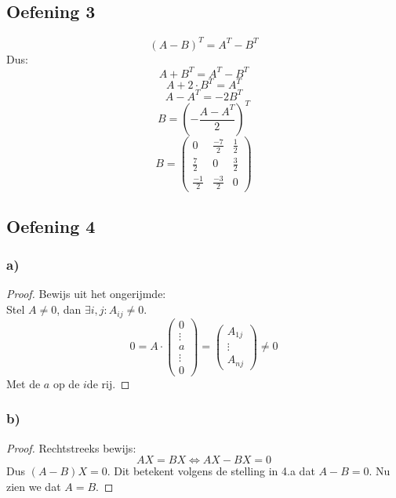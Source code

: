 \documentclass[lineaire_algebra_oplossingen.tex]{subfiles}
\begin{document}
\subsection{Oefening 3}
$$(A - B)^T = A^T - B^T$$
Dus:
$$A+B^T = A^T - B^T$$
$$A+2\cdot B^T = A^T$$
$$A - A^T = -2B^T$$
$$B = \left(-\frac{A - A^T}{2}\right)^T$$
$$ B = 
\begin{pmatrix}
0 & \frac{-7}{2} & \frac{1}{2}\\
\frac{7}{2} & 0 & \frac{3}{2}\\
\frac{-1}{2} & \frac{-3}{2} & 0
\end{pmatrix}
$$
\subsection{Oefening 4}
\subsubsection*{a)}
\begin{proof}
Bewijs uit het ongerijmde:\\
Stel $A \neq 0$, dan $\exists i, j: A_{ij} \neq 0$.
\[
0= A \cdot
\begin{pmatrix}
0\\\vdots\\a\\\vdots\\0
\end{pmatrix}
=
\begin{pmatrix}
A_{1j}\\\vdots\\A_{nj}
\end{pmatrix}
\neq 0
\]
Met de $a$ op de $i$de rij.
\end{proof}

\subsubsection*{b)}
\begin{proof}
Rechtstreeks bewijs:\\
\[
AX=BX \Leftrightarrow AX - BX=0
\]
Dus $(A-B)X=0$.
Dit betekent volgens de stelling in 4.a dat $A-B=0$.
Nu zien we dat $A=B$.
\end{proof}
\end{document}
